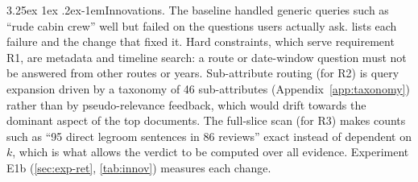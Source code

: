 \documentclass[10pt,twocolumn,a4paper]{article}
\makeatletter
\renewcommand\paragraph{\@startsection{paragraph}{4}{\parindent}%
  {3.25ex \@plus 1ex \@minus .2ex}{-1em}{\normalfont\normalsize\bfseries}}
\makeatother
\begin{document}
\paragraph{Innovations.} The baseline handled generic queries such as ``rude cabin crew'' well but failed on the
questions users actually ask.  lists each failure and the change that fixed it. Hard constraints, which serve
requirement R1, are metadata and timeline search: a route or date-window question must not be answered from other routes or years.
Sub-attribute routing (for R2) is query expansion driven by a taxonomy of 46 sub-attributes (Appendix~\ref{app:taxonomy})
rather than by pseudo-relevance feedback, which would drift towards the dominant aspect of the top documents. The
full-slice scan (for R3) makes counts such as ``95 direct legroom sentences in 86 reviews'' exact instead of dependent on
$k$, which is what allows the verdict to be computed over all evidence. Experiment E1b (\cref{sec:exp-ret},
\cref{tab:innov}) measures each change.
\end{document}
